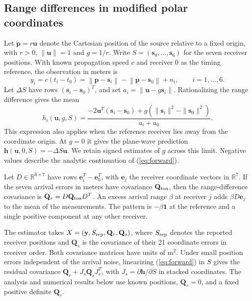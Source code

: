 \documentclass[journal]{IEEEtran}
\newcommand{\bu}{\mathbf{u}}
\newcommand{\bs}{\mathbf{s}}
\newcommand{\by}{\mathbf{y}}
\newcommand{\bh}{\mathbf{h}}
\newcommand{\bQ}{\mathbf{Q}}
\newcommand{\RR}{\mathbb{R}}
\newcommand{\norm}[1]{\left\lVert#1\right\rVert}
\begin{document}
\subsection{Range differences in modified polar coordinates}
Let \(\mathbf p=r\bu\) denote the Cartesian position of the source relative to a fixed origin, with \(r>0\), \(\|\bu\|=1\) and \(g=1/r\). Write \(S=(\bs_0,\ldots,\bs_6)\) for the seven receiver positions. With known propagation speed \(c\) and receiver 0 as the timing reference, the observation in meters is
\begin{equation}
 y_i=c(t_i-t_0)=\norm{\mathbf p-\bs_i}-\norm{\mathbf p-\bs_0}+n_i,
 \qquad i=1,\ldots,6 .
 \label{eq:obs}
\end{equation}
Let \(\Delta S\) have rows \((\bs_i-\bs_0)^T\), and set \(a_i=\|\bu-g\bs_i\|\). Rationalizing the range difference gives the mean
\begin{equation}
 h_i(\bu,g,S)=
 \frac{-2\bu^T(\bs_i-\bs_0)+g(\|\bs_i\|^2-\|\bs_0\|^2)}
      {a_i+a_0}.
 \label{eq:forward}
\end{equation}
This expression also applies when the reference receiver lies away from the coordinate origin. At \(g=0\) it gives the plane-wave prediction \(\bh(\bu,0,S)=-\Delta S\bu\). We retain signed estimates of \(g\) across this limit. Negative values describe the analytic continuation of (\ref{eq:forward}).

Let \(D\in\RR^{6\times7}\) have rows \(\mathbf e_i^T-\mathbf e_0^T\), with \(\mathbf e_j\) the receiver coordinate vectors in \(\RR^7\). If the seven arrival errors in meters have covariance \(\bQ_{\rm toa}\), then the range-difference covariance is \(\bQ_r=D\bQ_{\rm toa}D^T\). An excess arrival range \(\beta\) at receiver \(j\) adds \(\beta D\mathbf e_j\) to the mean of the measurements. The pattern is \(-\beta\mathbf1\) at the reference and a single positive component at any other receiver.

The estimator takes \(X=(\by,S_{\rm rep},\bQ_r,\bQ_s)\), where \(S_{\rm rep}\) denotes the reported receiver positions and \(\bQ_s\) is the covariance of their 21 coordinate errors in receiver order. Both covariance matrices have units of \(\mathrm{m}^2\). Under small position errors independent of the arrival noise, linearizing (\ref{eq:forward}) in \(S\) gives the residual covariance \(\bQ_r+J_s\bQ_sJ_s^T\), with \(J_s=\partial\bh/\partial S\) in stacked coordinates. The analysis and numerical results below use known positions, \(\bQ_s=0\), and a fixed positive definite \(\bQ_r\).
\end{document}
